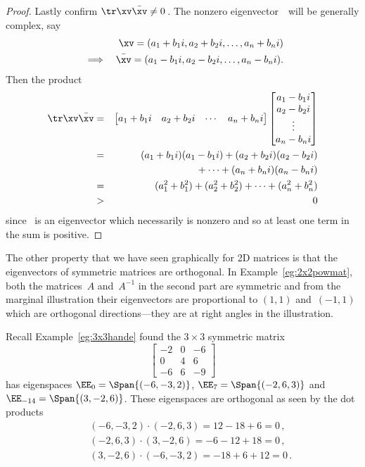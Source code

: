 \begin{proof}
Lastly confirm \(\tr\xv\bar\xv\neq0\)\,.  
The nonzero eigenvector~\xv\ will be generally complex, say 
\begin{eqnarray*}
&&\xv=(a_1+b_1i,a_2+b_2i,\ldots,a_n+b_ni)
\\&\implies&\bar\xv=(a_1-b_1i,a_2-b_2i,\ldots,a_n-b_ni).
\end{eqnarray*}
Then the product
\begin{eqnarray*}
\tr\xv\bar\xv&=&
\begin{bmatrix} a_1+b_1i&a_2+b_2i&\cdots&a_n+b_ni \end{bmatrix}
\begin{bmatrix} a_1-b_1i\\a_2-b_2i\\\vdots\\a_n-b_ni \end{bmatrix}
\\&=&(a_1+b_1i)(a_1-b_1i)+(a_2+b_2i)(a_2-b_2i)
\\&&{}+\cdots+(a_n+b_ni)(a_n-b_ni)
\\&=&(a_1^2+b_1^2)+(a_2^2+b_2^2)+\cdots+(a_n^2+b_n^2)
\\&>&0
\end{eqnarray*}
since \xv~is an eigenvector which necessarily is nonzero and so at least one term in the sum is positive.
\end{proof}


The other property that we have seen graphically for 2D matrices is that the eigenvectors of symmetric matrices are orthogonal.
In Example~\ref{eg:2x2powmat}, both the matrices~\(A\) and~\(A^{-1}\) in the second part are symmetric and from the marginal illustration their eigenvectors are proportional to \((1,1)\) and~\((-1,1)\) which are orthogonal directions---they are at right angles in the illustration.

\begin{example} \label{eg:}
Recall Example~\ref{eg:3x3hande} found the \(3\times3\) symmetric matrix
\begin{equation*}
\begin{bmatrix} -2&0&-6\\0&4&6\\-6&6&-9 \end{bmatrix}
\end{equation*}
has eigenspaces \(\EE_0=\Span\{(-6,-3,2)\}\), \(\EE_7=\Span\{(-2,6,3)\}\) and \(\EE_{-14}=\Span\{(3,-2,6)\}\).
These eigenspaces are orthogonal as seen by the dot products
\begin{eqnarray*}&&
(-6,-3,2)\cdot(-2,6,3)=12-18+6=0\,,
\\&&
(-2,6,3)\cdot(3,-2,6)=-6-12+18=0\,,
\\&&
(3,-2,6)\cdot(-6,-3,2)=-18+6+12=0\,.
\end{eqnarray*}
\end{example}




